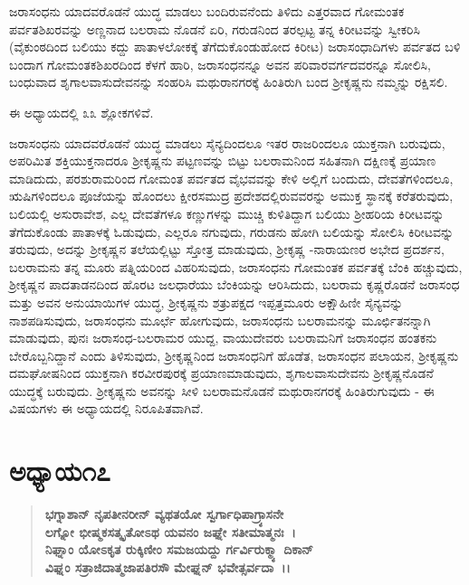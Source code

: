 ಜರಾಸಂಧನು ಯಾದವರೊಡನೆ ಯುದ್ಧ ಮಾಡಲು ಬಂದಿರುವನೆಂದು ತಿಳಿದು ಎತ್ತರವಾದ ಗೋಮಂತಕ ಪರ್ವತಶಿಖರವನ್ನು ಅಣ್ಣನಾದ ಬಲರಾಮ ನೊಡನೆ ಏರಿ, ಗರುಡನಿಂದ ತರಲ್ಪಟ್ಟ ತನ್ನ ಕಿರೀಟವನ್ನು ಸ್ವೀಕರಿಸಿ (ವೈಕುಂಠದಿಂದ ಬಲಿಯು ಕದ್ದು ಪಾತಾಳಲೋಕಕ್ಕೆ ತೆಗೆದುಕೊಂಡುಹೋದ ಕಿರೀಟ) ಜರಾಸಂಧಾದಿಗಳು ಪರ್ವತದ ಬಳಿ ಬಂದಾಗ ಗೋಮಂತಕಶಿಖರದಿಂದ ಕೆಳಗೆ ಹಾರಿ, ಜರಾಸಂಧನನ್ನೂ ಅವನ ಪರಿವಾರವರ್ಗದವರನ್ನೂ ಸೋಲಿಸಿ, ಬಂಧುವಾದ ಶೃಗಾಲವಾಸುದೇವನನ್ನು ಸಂಹರಿಸಿ ಮಥುರಾನಗರಕ್ಕೆ ಹಿಂತಿರುಗಿ ಬಂದ ಶ‍್ರೀಕೃಷ್ಣನು ನಮ್ಮನ್ನು ರಕ್ಷಿಸಲಿ.

ಈ ಅಧ್ಯಾಯದಲ್ಲಿ ೩೩ ಶ್ಲೋಕಗಳಿವೆ.

ಜರಾಸಂಧನು ಯಾದವರೊಡನೆ ಯುದ್ಧ ಮಾಡಲು ಸೈನ್ಯದಿಂದಲೂ ಇತರ ರಾಜರಿಂದಲೂ ಯುಕ್ತನಾಗಿ ಬರುವುದು, ಅಪರಿಮಿತ ಶಕ್ತಿಯುಕ್ತನಾದರೂ ಶ‍್ರೀಕೃಷ್ಣನು ಪಟ್ಟಣ\-ವನ್ನು ಬಿಟ್ಟು ಬಲರಾಮನಿಂದ ಸಹಿತನಾಗಿ ದಕ್ಷಿಣಕ್ಕೆ ಪ್ರಯಾಣ ಮಾಡಿದುದು, ಪರಶುರಾಮರಿಂದ ಗೋಮಂತ ಪರ್ವತದ ವೈಭವವನ್ನು ಕೇಳಿ ಅಲ್ಲಿಗೆ ಬಂದುದು, ದೇವತೆಗಳಿಂದಲೂ, ಋಷಿಗಳಿಂದಲೂ ಪೂಜೆಯನ್ನು ಹೊಂದಲು ಕ್ಷೀರಸಮುದ್ರ ಪ್ರದೇಶದಲ್ಲಿರುವವರನ್ನು ಅಮುಕ್ತ ಸ್ಥಾನಕ್ಕೆ ಕರೆತರುವುದು, ಬಲಿಯಲ್ಲಿ ಅಸುರಾವೇಶ, ಎಲ್ಲ ದೇವತೆಗಳೂ ಕಣ್ಣುಗಳನ್ನು ಮುಚ್ಚಿ ಕುಳಿತಿದ್ದಾಗ ಬಲಿಯು ಶ‍್ರೀಹರಿಯ ಕಿರೀಟವನ್ನು ತೆಗೆದುಕೊಂಡು ಪಾತಾಳಕ್ಕೆ ಓಡುವುದು, ಎಲ್ಲರೂ ನಗುವುದು, ಗರುಡನು ಹೋಗಿ ಬಲಿಯನ್ನು ಸೋಲಿಸಿ ಕಿರೀಟವನ್ನು ತರುವುದು, ಅದನ್ನು ಶ‍್ರೀಕೃಷ್ಣನ ತಲೆಯಲ್ಲಿಟ್ಟು ಸ್ತೋತ್ರ ಮಾಡುವುದು, ಶ‍್ರೀಕೃಷ್ಣ -\break ನಾರಾಯಣರ ಅಭೇದ ಪ್ರದರ್ಶನ, ಬಲರಾಮನು ತನ್ನ ಮೂರು ಪತ್ನಿಯರಿಂದ ವಿಹರಿಸುವುದು, ಜರಾಸಂಧನು ಗೋಮಂತಕ ಪರ್ವತಕ್ಕೆ ಬೆಂಕಿ ಹಚ್ಚುವುದು, ಶ‍್ರೀಕೃಷ್ಣನ ಪಾದತಾಡನದಿಂದ ಹೊರಟ ಜಲಧಾರೆಯು ಬೆಂಕಿಯನ್ನು ಆರಿಸಿದುದು, ಬಲರಾಮ ಕೃಷ್ಣರೊಡನೆ ಜರಾಸಂಧ ಮತ್ತು ಅವನ ಅನುಯಾಯಿಗಳ ಯುದ್ಧ, ಶ‍್ರೀಕೃಷ್ಣನು ಶತ್ರುಪಕ್ಷದ ಇಪ್ಪತ್ತಮೂರು ಅಕ್ಷೌಹಿಣೀ ಸೈನ್ಯವನ್ನು ನಾಶಪಡಿಸುವುದು, ಜರಾಸಂಧನು ಮೂರ್ಛೆ ಹೋಗುವುದು, ಜರಾಸಂಧನು ಬಲರಾಮನನ್ನು ಮೂರ್ಛಿತನನ್ನಾಗಿ ಮಾಡುವುದು, ಪುನಃ ಜರಾಸಂಧ-ಬಲರಾಮರ ಯುದ್ದ, ವಾಯುದೇವರು ಬಲರಾಮನಿಗೆ ಜರಾಸಂಧನ ಹಂತಕನು ಬೇರೊಬ್ಬನಿದ್ದಾನೆ ಎಂದು ತಿಳಿಸುವುದು, ಶ‍್ರೀಕೃಷ್ಣನಿಂದ ಜರಾಸಂಧನಿಗೆ ಹೊಡೆತ, ಜರಾಸಂಧನ ಪಲಾಯನ, ಶ‍್ರೀಕೃಷ್ಣನು ದಮಘೋಷನಿಂದ ಯುಕ್ತನಾಗಿ ಕರವೀರಪುರಕ್ಕೆ ಪ್ರಯಾಣಮಾಡುವುದು, ಶೃಗಾಲವಾಸುದೇವನು ಶ‍್ರೀಕೃಷ್ಣನೊಡನೆ ಯುದ್ಧಕ್ಕೆ ಬರುವುದು. ಶ‍್ರೀಕೃಷ್ಣನು ಅವನನ್ನು ಸೀಳಿ ಬಲರಾಮನೊಡನೆ ಮಥುರಾನಗರಕ್ಕೆ ಹಿಂತಿರುಗುವುದು - ಈ ವಿಷಯಗಳು ಈ ಅಧ್ಯಾಯದಲ್ಲಿ ನಿರೂಪಿತವಾಗಿವೆ.


\section*{ಅಧ್ಯಾಯ\enginline{-}೧೭}

\begin{verse}
\textbf{ಭಗ್ನಾಶಾನ್ ನೃಪತೀನರೀನ್ ವ್ಯಥತಯೋ ಸ್ವರ್ಗಾಧಿಪಾಗ್ರ್ಯಾಸನೇ} \\\textbf{ಲಗ್ನೋ ಭೀಷ್ಮಕಸತ್ಕೃತೋಽಥ ಯವನಂ ಜಘ್ನೇ ಸತೀಮಾತ್ಮನಃ~।}\\\textbf{ನಿಘ್ನಾಂ ಯೋಽಕೃತ ರುಕ್ಕಿಣೀಂ ಸಮಜಯದ್ದು ರ್ಗರ್ವಿರುಕ್ಮ್ಯಾ ದಿಕಾನ್} \\\textbf{ವಿಘ್ನಂ ಸತ್ರಾಜಿದಾತ್ಮಜಾಪತಿರಸೌ ಮೇಘ್ನನ್ ಭವೇತ್ಸರ್ವದಾ~।।}
\end{verse}

